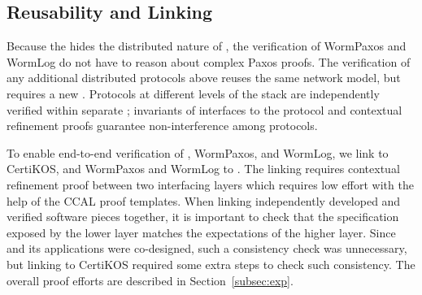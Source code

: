 \subsection{Reusability and Linking}
\label{subsec:proof_effort}

Because the \ghostlayer{} hides the distributed nature of \sysname{}, the verification of WormPaxos and WormLog do not have to reason about complex Paxos proofs. %
The verification of any additional distributed protocols above \sysname{} reuses the same network model, but requires a new \ghostlayer{}. Protocols at different levels of the stack are independently verified within separate \ghostlayers{}; invariants of interfaces to the protocol and contextual refinement proofs guarantee non-interference among protocols. 

To enable end-to-end verification of \sysname{}, WormPaxos, and WormLog, we link \sysname{} to CertiKOS, and WormPaxos and WormLog to \sysname{}. The linking requires contextual refinement proof between two interfacing layers which requires low effort with the help of the CCAL proof templates. When linking independently developed and verified software pieces together, it is important to check that the specification exposed by the lower layer matches the expectations of the higher layer. Since \sysname{} and its applications were co-designed, such a consistency check was unnecessary, but linking \sysname{} to CertiKOS required some extra steps to check such consistency. The overall proof efforts are described in Section~\ref{subsec:exp}.
	

